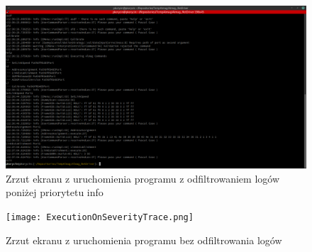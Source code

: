 	\begin{figure}[p]
	\includegraphics[scale=0.3]{ExecutionOnSeverityInfo.png}
	\caption{Zrzut ekranu z uruchomienia programu z odfiltrowaniem logów poniżej priorytetu info}
	\end{figure}
	
	\begin{figure}[p]
	\texttt{[image: ExecutionOnSeverityTrace.png]}
	\caption{Zrzut ekranu z uruchomienia programu bez odfiltrowania logów}
	\end{figure}

